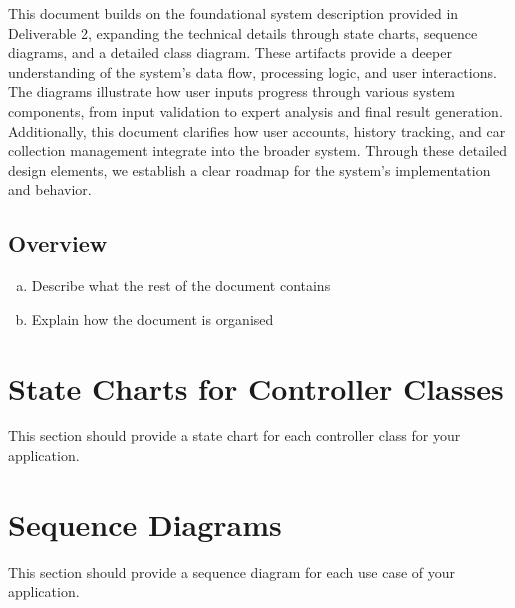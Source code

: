 \documentclass[]{article}
\begin{document}
\noindent This document builds on the foundational system description provided in Deliverable 2, expanding the technical details through state charts, sequence diagrams, and a detailed class diagram. These artifacts provide a deeper understanding of the system’s data flow, processing logic, and user interactions. The diagrams illustrate how user inputs progress through various system components, from input validation to expert analysis and final result generation. Additionally, this document clarifies how user accounts, history tracking, and car collection management integrate into the broader system. Through these detailed design elements, we establish a clear roadmap for the system’s implementation and behavior.


\subsection{Overview}
\label{sub:overview}
\begin{enumerate}[a)]
	\item Describe what the rest of the document contains 
	\item Explain how the document is organised
\end{enumerate}



\section{State Charts for Controller Classes}
\label{sec:state_charts_for_controller_classes}
This section should provide a state chart for each controller class for your application.

\section{Sequence Diagrams}
\label{sec:sequence_diagrams}
This section should provide a sequence diagram for each use case of your application.
\end{document}

